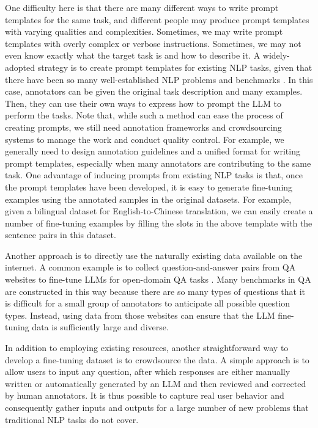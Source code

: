 One difficulty here is that there are many different ways to write prompt templates for the same task, and different people may produce prompt templates with varying qualities and complexities. Sometimes, we may write prompt templates with overly complex or verbose instructions. Sometimes, we may not even know exactly what the target task is and how to describe it. A widely-adopted strategy is to create prompt templates for existing NLP tasks, given that there have been so many well-established NLP problems and benchmarks \cite{bach-etal:2022promptsource,wang-etal:2022super,mishra-etal:2022cross}. In this case, annotators can be given the original task description and many examples. Then, they can use their own ways to express how to prompt the LLM to perform the tasks. Note that, while such a method can ease the process of creating prompts, we still need annotation frameworks and crowdsourcing systems to manage the work and conduct quality control. For example, we generally need to design annotation guidelines and a unified format for writing prompt templates, especially when many annotators are contributing to the same task. One advantage of inducing prompts from existing NLP tasks is that, once the prompt templates have been developed, it is easy to generate fine-tuning examples using the annotated samples in the original datasets. For example, given a bilingual dataset for English-to-Chinese translation, we can easily create a number of fine-tuning examples by filling the slots in the above template with the sentence pairs in this dataset.

Another approach is to directly use the naturally existing data available on the internet. A common example is to collect question-and-answer pairs from QA websites to fine-tune LLMs for open-domain QA tasks \cite{joshi-etal:2017triviaqa}. Many benchmarks in QA are constructed in this way because there are so many types of questions that it is difficult for a small group of annotators to anticipate all possible question types. Instead, using data from those websites can ensure that the LLM fine-tuning data is sufficiently large and diverse.

In addition to employing existing resources, another straightforward way to develop a fine-tuning dataset is to crowdsource the data. A simple approach is to allow users to input any question, after which responses are either manually written or automatically generated by an LLM and then reviewed and corrected by human annotators. It is thus possible to capture real user behavior and consequently gather inputs and outputs for a large number of new problems that traditional NLP tasks do not cover.

